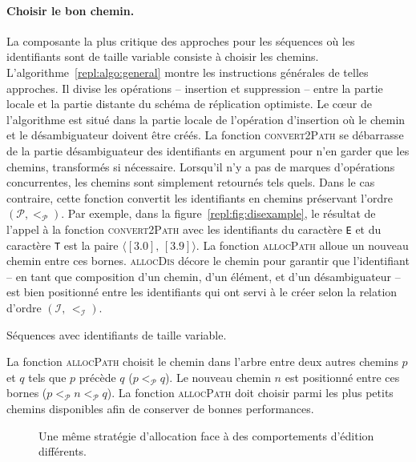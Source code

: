 \paragraph{Choisir le bon chemin.} La composante la plus critique des approches
pour les séquences où les identifiants sont de taille variable consiste à
choisir les chemins. L'algorithme~\ref{repl:algo:general} montre les
instructions générales de telles approches. Il divise les opérations --
insertion et suppression -- entre la partie locale et la partie distante du
schéma de réplication optimiste. Le cœur de l'algorithme est situé dans la
partie locale de l'opération d'insertion où le chemin et le désambiguateur
doivent être créés. La fonction \textsc{convert2Path} se débarrasse de la partie
désambiguateur des identifiants en argument pour n'en garder que les chemins,
transformés si nécessaire. Lorsqu'il n'y a pas de marques d'opérations
concurrentes, les chemins sont simplement retournés tels quels. Dans le cas
contraire, cette fonction convertit les identifiants en chemins préservant
l'ordre $(\mathcal{P}, <_\mathcal{P})$. Par exemple, dans la
figure~\ref{repl:fig:disexample}, le résultat de l'appel à la fonction
\textsc{convert2Path} avec les identifiants du caractère \texttt{E} et du
caractère \texttt{T} est la paire $\langle [3.0],\, [3.9] \rangle$. La fonction
\textsc{allocPath} alloue un nouveau chemin entre ces bornes. \textsc{allocDis}
décore le chemin pour garantir que l'identifiant -- en tant que composition d'un
chemin, d'un élément, et d'un désambiguateur -- est bien positionné entre les
identifiants qui ont servi à le créer selon la relation d'ordre
$(\mathcal{I},\, <_\mathcal{I})$.

\begin{algorithm}[h]
  
  \caption[Séquences avec identifiants de taille variable]
  {\label{repl:algo:general}Séquences avec identifiants de taille variable.}
\end{algorithm}

La fonction \textsc{allocPath} choisit le chemin dans l'arbre entre deux autres
chemins $p$ et $q$ tels que $p$ précède $q$ ($p <_\mathcal{P} q$). Le nouveau
chemin $n$ est positionné entre ces bornes
($p <_\mathcal{P} n <_\mathcal{P} q$). La fonction \textsc{allocPath} doit
choisir parmi les plus petits chemins disponibles afin de conserver de bonnes
performances.

\begin{figure}
  \begin{center}
  \hspace{30pt}
  \end{center}
  \caption[Une stratégie d'allocation contre les comportements d'édition] {Une
    même stratégie d'allocation face à des comportements d'édition différents.}
\end{figure}

